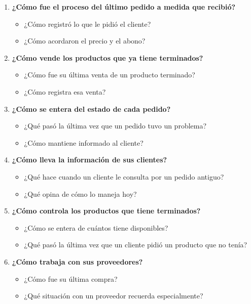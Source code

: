 \documentclass[11pt,a4paper]{article}
\begin{document}
	\begin{enumerate}
		\item \textbf{¿Cómo fue el proceso del último pedido a medida que recibió?}
		\begin{itemize}
			\item ¿Cómo registró lo que le pidió el cliente?
			\item ¿Cómo acordaron el precio y el abono?
		\end{itemize}

		\item \textbf{¿Cómo vende los productos que ya tiene terminados?}
		\begin{itemize}
			\item ¿Cómo fue su última venta de un producto terminado?
			\item ¿Cómo registra esa venta?
		\end{itemize}

		\item \textbf{¿Cómo se entera del estado de cada pedido?}
		\begin{itemize}
			\item ¿Qué pasó la última vez que un pedido tuvo un problema?
			\item ¿Cómo mantiene informado al cliente?
		\end{itemize}

		\item \textbf{¿Cómo lleva la información de sus clientes?}
		\begin{itemize}
			\item ¿Qué hace cuando un cliente le consulta por un pedido antiguo?
			\item ¿Qué opina de cómo lo maneja hoy?
		\end{itemize}

		\item \textbf{¿Cómo controla los productos que tiene terminados?}
		\begin{itemize}
			\item ¿Cómo se entera de cuántos tiene disponibles?
			\item ¿Qué pasó la última vez que un cliente pidió un producto que no tenía?
		\end{itemize}

		\item \textbf{¿Cómo trabaja con sus proveedores?}
		\begin{itemize}
			\item ¿Cómo fue su última compra?
			\item ¿Qué situación con un proveedor recuerda especialmente?
		\end{itemize}


\end{enumerate}
\end{document}
